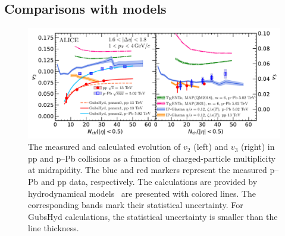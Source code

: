 \subsection{Comparisons with models}
\label{sec:theory}

\begin{figure}[h!]
	\centering
	\includegraphics[width=1.0\textwidth]{figures/FIG7_v2Mult_allSystems_Hydro.pdf} 
	\caption{The measured and calculated evolution of $v_2$ (left) and $v_3$ (right) in pp and p--Pb collisions as a function of charged-particle multiplicity at midrapidity.
The blue and red markers represent the measured p--Pb and pp data, respectively. The calculations are provided by hydrodynamical models~\cite{Parkkila:2021yha,Bernhard:2016tnd,Schenke:2020mbo,Taghavi:2019mqz} are presented with colored lines. The corresponding bands mark their statistical uncertainty. For GubsHyd calculations, the statistical uncertainty is smaller than the line thickness.} 
	\label{fig:vnmult_model}
\end{figure}

